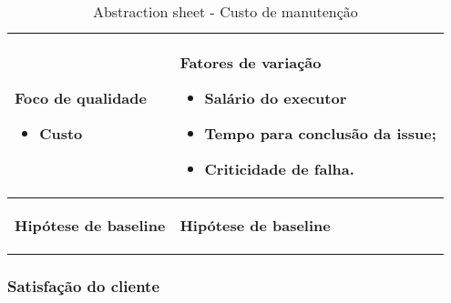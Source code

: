 \begin{table}[H]
\centering
\begin{tabular}{|p{4cm}|p{4cm}|}
\hline
	\begin{center}
	\textbf{Foco de qualidade}
	\end{center}

	\begin{itemize}
		\item Custo
	\end{itemize}

	&

	\begin{center}
	\textbf{Fatores de variação}
	\end{center}

	\begin{itemize}
		\item{Salário do executor}
		\item{Tempo para conclusão da issue;}
		\item{Criticidade de falha.}
	\end{itemize}

	\\ \hline
	\begin{center}
	\textbf{Hipótese de baseline}
	\end{center}

	&

	\begin{center}
	\textbf{Hipótese de baseline}
	\end{center}

	\\ \hline
\end{tabular}
\caption{Abstraction sheet - Custo de manutenção}
\label{tab:manutencao_sheet}
\end{table}

\subsubsection{Satisfação do cliente}

